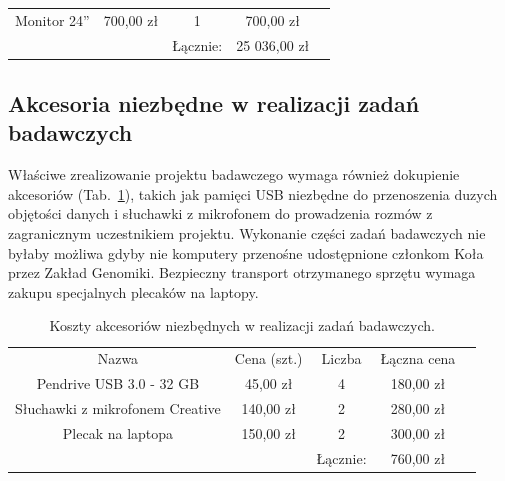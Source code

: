 \documentclass{article}
\begin{document}
\begin{table}[]
\begin{tabular}{ccccl}
      \\ \cline{1-4}
\multicolumn{1}{|c|}{Monitor 24''}                                               
                          & \multicolumn{1}{c|}{700,00 zł}   & 
\multicolumn{1}{c|}{1}      & \multicolumn{1}{c|}{700,00 zł}    &                
      \\ \cline{1-4}
                                                                                 
                          &                                  & Łącznie:          
          & 25 036,00 zł                       & \multicolumn{1}{c}{}
\end{tabular}
\end{table}

\subsection{Akcesoria niezbędne w realizacji zadań badawczych}

Właściwe zrealizowanie projektu badawczego wymaga również dokupienie 
akcesoriów (Tab.~\ref{tab:akcesoria}), takich jak pamięci USB niezbędne do 
przenoszenia duzych objętości danych i słuchawki z mikrofonem do prowadzenia 
rozmów z zagranicznym uczestnikiem projektu. Wykonanie części zadań badawczych 
nie byłaby możliwa gdyby nie komputery przenośne udostępnione członkom Koła 
przez Zakład Genomiki. Bezpieczny transport otrzymanego sprzętu wymaga zakupu 
specjalnych plecaków na laptopy.

\begin{table}[]
\centering
\caption{Koszty akcesoriów niezbędnych w realizacji zadań badawczych.}
\label{tab:akcesoria}
\begin{tabular}{ccccc}
\cline{1-4}
\multicolumn{1}{|c|}{Nazwa}                           & \multicolumn{1}{c|}{Cena 
(szt.)} & \multicolumn{1}{c|}{Liczba} & \multicolumn{1}{c|}{Łączna cena} &       
               \\ \cline{1-4}
\multicolumn{1}{|c|}{Pendrive USB 3.0 - 32 GB}        & 
\multicolumn{1}{c|}{45,00 zł}    & \multicolumn{1}{c|}{4}      & 
\multicolumn{1}{c|}{180,00 zł}   &                      \\ \cline{1-4}
\multicolumn{1}{|c|}{Słuchawki z mikrofonem Creative} & 
\multicolumn{1}{c|}{140,00 zł}   & \multicolumn{1}{c|}{2}      & 
\multicolumn{1}{c|}{280,00 zł}   &                      \\ \cline{1-4}
\multicolumn{1}{|c|}{Plecak na laptopa}               & 
\multicolumn{1}{c|}{150,00 zł}   & \multicolumn{1}{c|}{2}      & 
\multicolumn{1}{c|}{300,00 zł}   & \multicolumn{1}{l}{} \\ \cline{1-4}
                                                      &                          
        & Łącznie:                    & 760,00 zł                        &       
              
\end{tabular}
\end{table}
\end{document}
